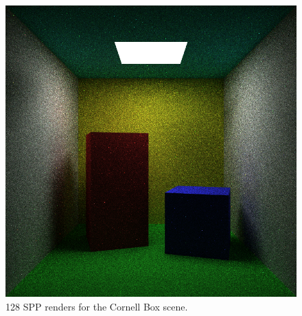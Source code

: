 \documentclass[ %
                    author={Callum Pearce},
                supervisor={Dr. Neill Campbell},
                    degree={MEng},
                     title={Learning the incident radiance for a continuous state space rather than a discrete one is more beneficial for Importance Sampling in Monte Carlo Path Tracing},
                  subtitle={},
                      type={research},
                      year={2019} ]{dissertation}
\begin{document}
\begin{figure}[h]
\endminipage\hspace{1em}
  \includegraphics[width=\textwidth]{images/renders/cornell/nn.png}
\endminipage
\caption{128 SPP renders for the Cornell Box scene.}
\label{fig:cornell}
\end{figure}
\end{document}
